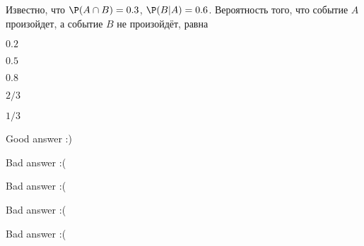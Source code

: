 
\begin{question}
Известно, что \(\P(A\cap B)= 0.3\), \(\P(B|A)=0.6\). Вероятность того,
что событие \(A\) произойдет, а событие \(B\) не произойдёт, равна
\begin{answerlist}
  \item \(0.2\)
  \item \(0.5\)
  \item \(0.8\)
  \item \(2/3\)
  \item \(1/3\)
\end{answerlist}
\end{question}

\begin{solution}
\begin{answerlist}
  \item Good answer :)
  \item Bad answer :(
  \item Bad answer :(
  \item Bad answer :(
  \item Bad answer :(
\end{answerlist}
\end{solution}

